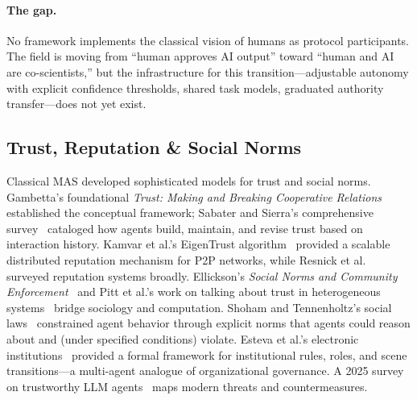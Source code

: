 \documentclass{article}
\begin{document}
\paragraph{The gap.}
No framework implements the classical vision of humans as protocol participants.
The field is moving from ``human approves AI output'' toward ``human and AI are
co-scientists,'' but the infrastructure for this transition---adjustable autonomy with
explicit confidence thresholds, shared task models, graduated authority transfer---does
not yet exist.

\subsection{Trust, Reputation \& Social Norms}
\label{sec:p-trust}

%
%
%
%
%

Classical MAS developed sophisticated models for trust and social norms.
Gambetta's foundational \emph{Trust: Making and Breaking Cooperative
Relations}~\citep{sutra16707_trust1989} established the conceptual framework; Sabater
and Sierra's comprehensive survey~\citep{sabater2005review, sutra18058_survey2005}
cataloged how agents build, maintain, and revise trust based on interaction history.
Kamvar et al.'s EigenTrust algorithm~\citep{sutra19226_eigentrust2003} provided
a scalable distributed reputation mechanism for P2P networks, while Resnick et
al.~\citep{sutra19808_reputation2000} surveyed reputation systems broadly. Ellickson's
\emph{Social Norms and Community
Enforcement}~\citep{sutra17532_social1992} and Pitt et al.'s work on talking about
trust in heterogeneous systems~\citep{sutra35085_talking2011} bridge sociology and
computation. Shoham and Tennenholtz's social
laws~\citep{shoham1995social} constrained agent behavior through explicit norms
that agents could reason about and (under specified conditions) violate. Esteva et
al.'s electronic institutions~\citep{esteva2001electronic} provided a formal framework
for institutional rules, roles, and scene transitions---a multi-agent analogue of
organizational governance. A 2025 survey on trustworthy LLM
agents~\citep{sutra14486_survey2025} maps modern threats and countermeasures.
\end{document}
